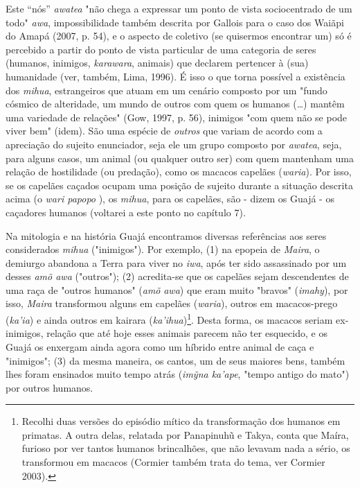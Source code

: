 Este ``nós'' \emph{awatea} "não chega a expressar um ponto de vista
sociocentrado de um todo" \emph{awa}, impossibilidade também descrita
por Gallois para o caso dos Waiãpi do Amapá (2007, p. 54), e o aspecto
de coletivo (se quisermos encontrar um) só é percebido a partir do ponto
de vista particular de uma categoria de seres (humanos, inimigos,
\emph{karawara}, animais) que declarem pertencer à (sua) humanidade
(ver, também, Lima, 1996). É isso o que torna possível a existência dos
\emph{mihua}, estrangeiros que atuam em um cenário composto por um
"fundo cósmico de alteridade, um mundo de outros com quem os humanos
(\ldots{}) mantêm uma variedade de relações" (Gow, 1997, p. 56), inimigos
"com quem não se pode viver bem" (idem). São uma espécie de
\emph{outros} que variam de acordo com a apreciação do sujeito
enunciador, seja ele um grupo composto por \emph{awatea}, seja, para
alguns casos, um animal (ou qualquer outro ser) com quem mantenham uma
relação de hostilidade (ou predação), como os macacos capelães
(\emph{waria}). Por isso, se os capelães caçados ocupam uma posição de
sujeito durante a situação descrita acima (o \emph{wari papopo} ), os
\emph{mihua}, para os capelães, são - dizem os Guajá - os caçadores
humanos (voltarei a este ponto no capítulo 7).

Na mitologia e na história Guajá encontramos diversas referências aos
seres considerados \emph{mihua} ("inimigos"). Por exemplo, (1) na
epopeia de \emph{Maira}, o demiurgo abandona a Terra para viver no
\emph{iwa}, após ter sido assassinado por um desses \emph{amõ awa}
("outros"); (2) acredita-se que os capelães sejam descendentes de uma
raça de "outros humanos" (\emph{amõ} \emph{awa}) que eram muito "bravos"
(\emph{imahy}), por isso, \emph{Maira} transformou alguns em capelães
(\emph{waria}), outros em macacos-prego (\emph{ka'ia}) e ainda outros em
kairara (\emph{ka'ihua})\footnote{Recolhi duas versões do episódio
  mítico da transformação dos humanos em primatas. A outra delas,
  relatada por Panapinuhũ e Takya, conta que Maíra, furioso por ver
  tantos humanos brincalhões, que não levavam nada a sério, os
  transformou em macacos (Cormier também trata do tema, ver Cormier
  2003).}. Desta forma, os macacos seriam ex-inimigos, relação que até
hoje esses animais parecem não ter esquecido, e os Guajá os enxergam
ainda agora como um híbrido entre animal de caça e "inimigos"; (3) da
mesma maneira, os cantos, um de seus maiores bens, também lhes foram
ensinados muito tempo atrás (\emph{imỹna ka'ape}, "tempo antigo do
mato") por outros humanos.

